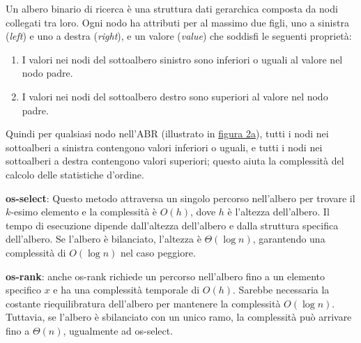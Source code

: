 \documentclass[onecolumn]{article}
\begin{document}
Un albero binario di ricerca è una struttura dati gerarchica composta da nodi collegati tra loro. Ogni nodo ha attributi per al massimo due figli, uno a sinistra (\textit{left}) e uno a destra (\textit{right}), e un valore (\textit{value}) che soddisfi le seguenti proprietà:

\begin{enumerate}
\setlength\itemsep{-0.25em}
    \item I valori nei nodi del sottoalbero sinistro sono inferiori o uguali al valore nel nodo padre.
    \item I valori nei nodi del sottoalbero destro sono superiori al valore nel nodo padre.
\end{enumerate}

Quindi per qualsiasi nodo nell'ABR (illustrato in \hyperref[fig:alberi]{figura 2a}), tutti i nodi nei sottoalberi a sinistra contengono valori inferiori o uguali, e tutti i nodi nei sottoalberi a destra contengono valori superiori; questo aiuta la complessità del calcolo delle statistiche d'ordine. \vspace{1em}

\textbf{os-select}: Questo metodo attraversa un singolo percorso nell'albero per trovare il $k$-esimo elemento e la complessità è $O(h)$, dove $h$ è l'altezza dell'albero. Il tempo di esecuzione dipende dall'altezza dell'albero e dalla struttura specifica dell'albero. Se l'albero è bilanciato, l'altezza è $\Theta(\log n)$, garantendo una complessità di $O(\log n)$ nel caso peggiore. \vspace{0.5em}

\textbf{os-rank}: anche os-rank richiede un percorso nell'albero fino a un elemento specifico $x$ e ha una complessità temporale di $O(h)$. Sarebbe necessaria la costante riequilibratura dell'albero per mantenere la complessità $O(\log n)$. Tuttavia, se l'albero è sbilanciato con un unico ramo, la complessità può arrivare fino a $\Theta(n)$, ugualmente ad os-select.
\end{document}
